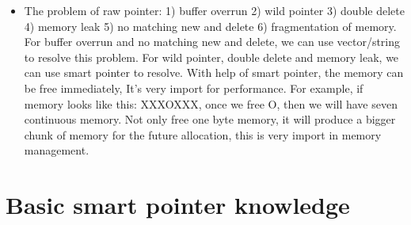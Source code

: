 \documentclass[a4paper,11pt,twoside]{book}
\begin{document}
\begin{itemize}
	\item The problem of raw pointer: 1) buffer overrun 2) wild pointer 3) double delete 4) memory leak 5) no matching new and delete 6) fragmentation of memory. For buffer overrun and no matching new and delete, we can use vector/string to resolve this problem. For wild pointer, double delete and memory leak, we can use smart pointer to resolve. With help of smart pointer, the memory can be free immediately, It's very import for performance. For example, if memory looks like this: XXXOXXX, once we free O, then we will have seven continuous memory. Not only free one byte memory, it will produce a bigger chunk of memory for the future allocation, this is very import in memory management. 
\end{itemize}


\section{Basic smart pointer knowledge}
\end{document}

